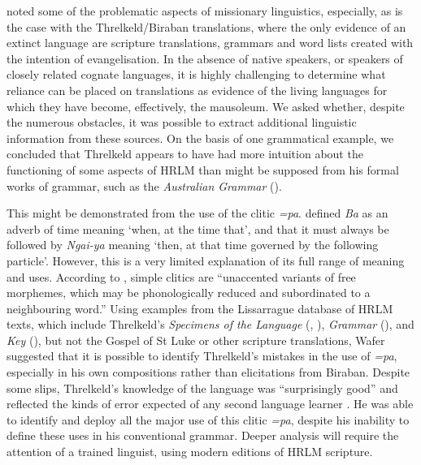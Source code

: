 {\citet[120--125]{wafer_waiting_2011} noted some of the problematic aspects of missionary linguistics, especially, as is the case with the Threlkeld/Biraban translations, where the only evidence of an extinct language are scripture translations, grammars and word lists created with the intention of evangelisation. In the absence of native speakers, or speakers of closely related cognate languages, it is highly challenging to determine what reliance can be placed on translations as evidence of the living languages for which they have become, effectively, the mausoleum. We asked whether, despite the numerous obstacles, it was possible to extract additional linguistic information from these sources. On the basis of one grammatical example, we concluded that Threlkeld appears to have had more intuition about the functioning of some aspects of HRLM than might be supposed from his formal works of grammar, such as the \textit{Australian Grammar} (\citeyear{threlkeld_australian_1834}).

This might be demonstrated from the use of the clitic \textit{=pa}. \citet[76]{threlkeld_australian_1834} defined \textit{Ba} as an adverb of time meaning ‘when, at the time that’, and that it must always be followed by \textit{Ngai-ya} meaning ‘then, at that time governed by the following particle’. However, this is a very limited explanation of its full range of meaning and uses. According to \citet[9]{anderson_what_2005}, simple clitics are “unaccented variants of free morphemes, which may be phonologically reduced and subordinated to a neighbouring word.”  Using examples from the Lissarrague database of HRLM texts, which include Threlkeld’s \textit{Specimens of the Language} (\citeyear{threlkeld_specimens_1824}, \citeyear{threlkeld_specimens_1827}), \textit{Grammar} (\citeyear{threlkeld_australian_1834}), and \textit{Key} (\citeyear{threlkeld_key_1850}), but not the Gospel of St Luke or other scripture translations, Wafer suggested that it is possible to identify Threlkeld’s mistakes in the use of \textit{=pa}, especially in his own compositions rather than elicitations from Biraban. Despite some slips, Threlkeld’s knowledge of the language was “surprisingly good” and reflected the kinds of error expected of any second language learner \citep[132]{carey_lancelot_2010}. He was able to identify and deploy all the major use of this clitic \textit{=pa}, despite his inability to define these uses in his conventional grammar. Deeper analysis will require the attention of a trained linguist, using modern editions of HRLM scripture.

}
